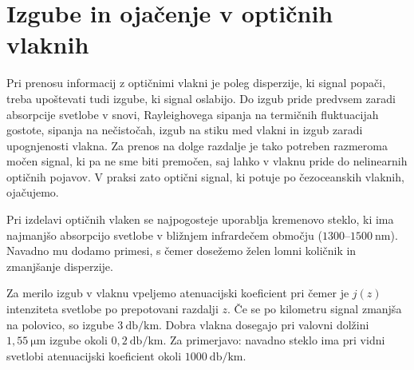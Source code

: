 \section{Izgube in ojačenje v optičnih vlaknih}
Pri prenosu informacij z optičnimi vlakni je poleg disperzije, ki signal popači,
treba upoštevati tudi izgube, ki signal oslabijo. 
Do izgub pride predvsem zaradi absorpcije svetlobe v snovi,
Rayleighovega sipanja na termičnih fluktuacijah gostote, sipanja na nečistočah, 
izgub na stiku med vlakni in izgub zaradi upognjenosti vlakna. Za prenos na dolge
razdalje je tako potreben razmeroma močen signal, ki pa ne sme biti premočen,
saj lahko v vlaknu pride do nelinearnih optičnih pojavov. V praksi zato 
optični signal, ki potuje po čezoceanskih vlaknih, ojačujemo. 

Pri izdelavi optičnih vlaken se najpogosteje uporablja kremenovo steklo, ki 
ima najmanjšo absorpcijo svetlobe v bližnjem infrardečem območju 
($1300$--$1500~\si{\nano\meter}$).
Navadno mu dodamo primesi, s čemer dosežemo želen lomni količnik in 
zmanjšanje disperzije. 

Za merilo izgub v vlaknu vpeljemo atenuacijski 
koeficient
pri čemer je $j(z)$ intenziteta svetlobe po prepotovani razdalji $z$. Če se po 
kilometru signal zmanjša na polovico, so izgube $3~\si{\decibel/\kilo\meter}$.
Dobra vlakna dosegajo pri valovni dolžini $1,55~\si{\micro\meter}$ izgube okoli 
$0,2~\si{\decibel/\kilo\meter}$. 
Za primerjavo: navadno steklo ima pri vidni svetlobi atenuacijski koeficient okoli 
$1000~\si{\decibel/\kilo\meter}$.

